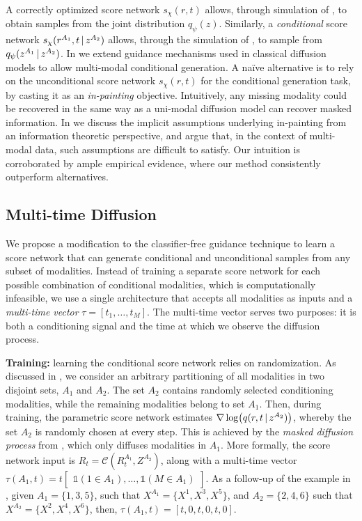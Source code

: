 
A correctly optimized score network $s_\chi(r,t)$ allows, through simulation of , to obtain samples from the joint distribution $q_\psi(z)$. Similarly, a \textit{conditional} score network $s_\chi(r^{A_1},t\,|\, z^{A_2})$ allows, through the simulation of , to sample from $q_\psi(z^{A_1}\,|\, z^{A_2})$. In  we extend guidance mechanisms used in classical diffusion models to allow multi-modal conditional generation. A na\"ive alternative is to rely on the unconditional score network $s_\chi(r,t)$ for the conditional generation task, by casting it as an \textit{in-painting} objective. Intuitively, any missing modality could be recovered in the same way as a uni-modal diffusion model can recover masked information.%
In  we discuss the implicit assumptions underlying in-painting from an information theoretic perspective, and argue that, in the context of multi-modal data, such assumptions are difficult to satisfy. Our intuition is corroborated by ample empirical evidence, where our method consistently outperform alternatives.

\subsection{Multi-time Diffusion}
\label{sec:multitime}

We propose a modification to the classifier-free guidance technique \citep{ho2022classifier} to learn a score network that can generate conditional and unconditional samples from any subset of modalities. Instead of training a separate score network for each possible combination of conditional modalities, which is computationally infeasible, we use a single architecture that accepts all modalities as inputs and a \textit{multi-time vector} $\tau=[t_1,\dots,t_M]$. The multi-time vector serves two purposes: it is both a conditioning signal and the time at which we observe the diffusion process. 

\noindent \textbf{Training:} learning the conditional score network relies on randomization. As discussed in , we consider an arbitrary partitioning of all modalities in two disjoint sets, $A_1$ and $A_2$. The set $A_2$ contains randomly selected conditioning modalities, while the remaining modalities belong to set $A_1$. Then, during training, the parametric score network estimates $\nabla\log(q(r,t\,|\, z^{A_2}))$, whereby the set $A_2$ is randomly chosen at every step. This is achieved by the \textit{masked diffusion process} from , which only diffuses modalities in $A_1$. More formally, the score network input is $R_t=\mathcal{C}(R^{A_1}_t,Z^{A_2})$, along with a multi-time vector ${\tau}(A_1,t) = t\begin{bmatrix} \mathds{1}(1\in A_1),\dots,\mathds{1}(M\in A_1) \end{bmatrix}$.
As a follow-up of the example in , given $A_1 = \{1,3,5\}$, such that $X^{A_1} = \{X^1, X^3, X^5 \}$, and $A_2 = \{2,4,6\}$ such that $X^{A_2} = \{X^2, X^4, X^6 \}$, then, ${\tau}(A_1,t) = [t,0,t,0,t,0]$.


